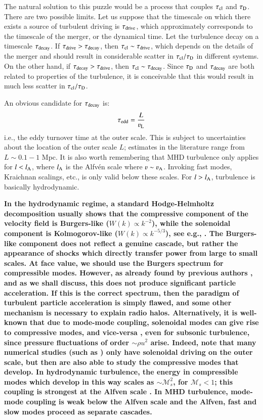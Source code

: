 \documentclass[fleqn,usenatbib,useAMS]{mnras}
\newcommand\C[1]{{\bf #1}}
\begin{document}
The natural solution to this puzzle would be a process that couples
$\tau_{\rm cl}$ and $\tau_{\rm D}$. There are two possible limits. Let
us suppose that the timescale on which there exists a source of
turbulent driving is $\tau_{\rm drive}$, which approximately
corresponds to the timescale of the merger, or the dynamical time. Let
the turbulence decay on a timescale $\tau_{\rm decay}$. If $\tau_{\rm
  drive} > \tau_{\rm decay}$, then $\tau_{\rm cl} \sim \tau_{\rm
  drive}$, which depends on the details of the merger and should
result in considerable scatter in $\tau_{\rm cl}/\tau_{\rm D}$ in
different systems. On the other hand, if $\tau_{\rm decay} > \tau_{\rm
  drive}$, then $\tau_{\rm cl} \sim \tau_{\rm decay}$. Since
$\tau_{\rm D}$ and $\tau_{\rm decay}$ are both related to properties
of the turbulence, it is conceivable that this would result in much
less scatter in $\tau_{\rm cl}/\tau_{\rm D}$.

An obvious candidate for $\tau_{\rm decay}$ is: 
\C{\begin{equation}
\tau_{\rm edd} = \frac{L}{\varv_{\rm L}}
\end{equation}}
i.e., the eddy turnover time at the outer scale. This is subject to
uncertainties about the location of the outer scale $L$; estimates in the
literature range from $L \sim 0.1-1$ Mpc. It is also worth remembering that MHD
turbulence only applies for $l < l_{\rm A}$, where $l_{\rm A}$ is the Alfv{\'e}n
scale where $\varv \sim \varv_{\rm A}$. Invoking fast modes, Kraichnan scalings,
etc., is only valid below these scales. For $l > l_{\rm A}$, turbulence is
basically hydrodynamic.  

\C{In the hydrodynamic regime, a standard Hodge-Helmholtz decomposition usually shows that the compressive component of the velocity field is Burgers-like ($W(k) \propto k^{-2}$), while the solenoidal component is Kolmogorov-like ($W(k) \propto k^{-5/3}$), see e.g., \citet{federrath13}. The Burgers-like component does not reflect a genuine cascade, but rather the appearance of shocks which directly transfer power from large to small scales. At face value, we should use the Burgers spectrum for compressible modes. However, as already found by previous authors \citep{miniati15, brunetti16}, and as we shall discuss, this does not produce significant particle acceleration. If this is the correct spectrum, then the paradigm of turbulent particle acceleration is simply flawed, and some other mechanism is necessary to explain radio halos. Alternatively, it is well-known that due to mode-mode coupling,  solenoidal modes can give rise to compressive modes, and vice-versa \citep{kida90,cho03,kritsuk07}, even for subsonic turbulence, since pressure fluctuations of order $\sim \rho u^{2}$ arise. Indeed, note that many numerical studies (such as \citet{cho03,kritsuk07}) only have solenoidal driving on the outer scale, but then are also able to study the compressive modes that develop. In hydrodynamic turbulence, the energy in compressible modes which develop in this way scales as $\sim \mathcal{M}_{s}^2$, for $\mathcal{M}_{s} < 1$; this coupling is strongest at the Alfven scale \citep{cho03}. In MHD turbulence, mode-mode coupling is weak below the Alfven scale and the Alfven, fast and slow modes proceed as separate cascades.}
\end{document}

